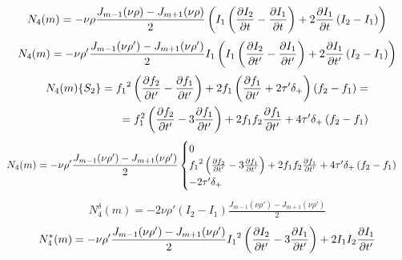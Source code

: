 %
\textcolor{lightgray} { \begin{equation*} \begin{aligned}
N_4 (m) = - \nu \rho
\frac{J_{m-1} (\nu \rho) - J_{m+1} (\nu \rho)}{2}
\left( I_1 \left( \frac{\partial I_2}{\partial t} - \frac{\partial I_1}{\partial t} \right) + 
2 \frac{\partial I_1}{\partial t} \left( I_2 - I_1 \right) \right)
\end{aligned} \end{equation*} }
%
\begin{equation*} \begin{aligned}
N_4 (m) = - \nu \rho'
\frac{J_{m-1} (\nu \rho') - J_{m+1} (\nu \rho')}{2} I_1
\left( I_1 \left( \frac{\partial I_2}{\partial t'} - \frac{\partial I_1}{\partial t'} \right) + 
2 \frac{\partial I_1}{\partial t'} \left( I_2 - I_1 \right) \right)
\end{aligned} \end{equation*}
%
\textcolor{lightgray} { \begin{equation*} \begin{aligned}
N_4 (m) \{ S_2 \} = {f_1}^2 
\left( \frac{\partial f_2}{\partial t'} - \frac{\partial f_1}{\partial t'} \right) + 
2 f_1 \left( \frac{\partial f_1}{\partial t'} + 2 \tau' \delta_+ \right) 
\left( f_2 - f_1 \right) = \\
= f_1^2 \left( \frac{\partial f_2}{\partial t'} - 3 \frac{\partial f_1}{\partial t'} \right) 
+ 2 f_1 f_2 \frac{\partial f_1}{\partial t'} + 4 \tau' \delta_+ \left( f_2 - f_1 \right)
\end{aligned} \end{equation*} }
%
\textcolor{lightgray} { \begin{equation*} \begin{aligned}
N_4 (m) = - \nu \rho'
\frac{J_{m-1} (\nu \rho') - J_{m+1} (\nu \rho')}{2} \begin{cases} 0 \\ 
{f_1}^2 \left( \frac{\partial f_2}{\partial t'} - 3 \frac{\partial f_1}{\partial t'} \right) 
+ 2 f_1 f_2 \frac{\partial f_1}{\partial t'} + 4 \tau' \delta_+ \left( f_2 - f_1 \right) \\
- 2 \tau' \delta_+
\end{cases} \end{aligned} \end{equation*} }
%
\begin{equation*} \begin{aligned}
N_4^\delta (m) = - 2 \nu \rho' \left( I_2 - I_1 \right)
\frac{J_{m-1} (\nu \rho') - J_{m+1} (\nu \rho')}{2}
\end{aligned} \end{equation*}
%
\begin{equation*} \begin{aligned}
N_4^* (m) = - \nu \rho'
\frac{J_{m-1} (\nu \rho') - J_{m+1} (\nu \rho')}{2} {I_1}^2
\left( \frac{\partial I_2}{\partial t'} - 3 \frac{\partial I_1}{\partial t'} \right) + 
2 I_1 I_2 \frac{\partial I_1}{\partial t'}
\end{aligned} \end{equation*}
